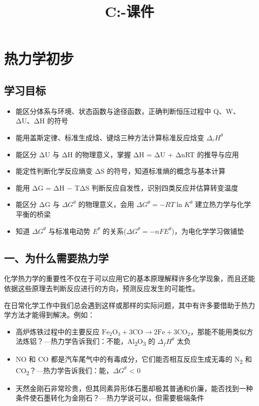 \documentclass[a4paper,11pt]{ctexart}
\title{C:\Obsidion\妙妙屋\04-课件\学生讲义\热力学初步}
\date{}
\providecommand{\tightlist}{\setlength{\itemsep}{0pt}\setlength{\parskip}{0pt}}
\newcommand{\箭}{\ensuremath{\rightarrow}}
\newcommand{\左箭}{\ensuremath{\leftarrow}}
\newcommand{\上箭}{\ensuremath{\uparrow}}
\newcommand{\下箭}{\ensuremath{\downarrow}}
\newcommand{\衡}{\ensuremath{\rightleftharpoons}}
\newcommand{\双箭}{\ensuremath{\leftrightarrow}}
\newcommand{\约等于}{\ensuremath{\approx}}
\newcommand{\小于等于}{\ensuremath{\leq}}
\newcommand{\大于等于}{\ensuremath{\geq}}
\newcommand{\不等于}{\ensuremath{\neq}}
\newcommand{\西格马}{\ensuremath{\sigma}}
\newcommand{\派}{\ensuremath{\pi}}
\begin{document}
\maketitle
\tableofcontents
\newpage
\section{热力学初步}\label{ux70edux529bux5b66ux521dux6b65}

\subsection{学习目标}\label{ux5b66ux4e60ux76eeux6807}

\begin{itemize}
\tightlist
\item
  能区分体系与环境、状态函数与途径函数，正确判断恒压过程中 Q、W、ΔU、ΔH 的符号
\item
  能用盖斯定律、标准生成焓、键焓三种方法计算标准反应焓变 \(\Delta_r H^\theta\)
\item
  能区分 ΔU 与 ΔH 的物理意义，掌握 ΔH = ΔU + ΔnRT 的推导与应用
\item
  能定性判断化学反应熵变 ΔS 的符号，知道标准熵的概念与基本计算
\item
  能用 ΔG = ΔH − TΔS 判断反应自发性，识别四类反应并估算转变温度
\item
  能区分 ΔG 与 \(\Delta G^\theta\) 的物理意义，会用 \(\Delta G^\theta = -RT \ln K^\theta\) 建立热力学与化学平衡的桥梁
\item
  知道 \(\Delta G^\theta\) 与标准电动势 \(E^\theta\) 的关系(\(\Delta G^\theta = -nFE^\theta\))，为电化学学习做铺垫
\end{itemize}

\subsection{一、为什么需要热力学}\label{ux4e00ux4e3aux4ec0ux4e48ux9700ux8981ux70edux529bux5b66}

化学热力学的重要性不仅在于可以应用它的基本原理解释许多化学现象，而且还能依据这些原理去判断反应进行的方向，预测反应发生的可能性。

在日常化学工作中我们总会遇到这样或那样的实际问题，其中有许多要借助于热力学方法才能得到解决。例如：

\begin{itemize}
\tightlist
\item
  高炉炼铁过程中的主要反应 \(\mathrm{Fe_2O_3 + 3CO \to 2Fe + 3CO_2}\)，那能不能用类似方法炼铝？---热力学告诉我们：不能，Al\textsubscript{2}O\textsubscript{3} 的 \(\Delta_f H^\theta\) 太负
\item
  NO 和 CO 都是汽车尾气中的有毒成分，它们能否相互反应生成无毒的 N\textsubscript{2} 和 CO\textsubscript{2}？---热力学告诉我们：能，\(\Delta G^\theta\) \textless{} 0
\item
  天然金刚石非常珍贵，但其同素异形体石墨却极其普通和价廉，能否找到一种条件使石墨转化为金刚石？---热力学说可以，但需要极端条件
\end{itemize}
\end{document}

